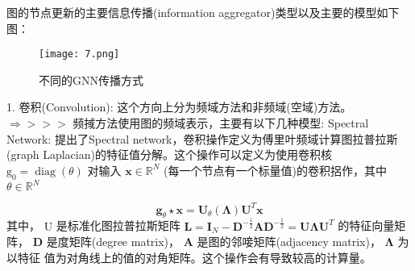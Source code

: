 \documentclass[a4paper,UTF8]{article}
\numberwithin{equation}{section}
\begin{document}
{		图的节点更新的主要信息传播(information aggregator)类型以及主要的模型如下图：
		\begin{figure}[ht]
			\centering
			\texttt{[image: 7.png]}
			\caption{不同的GNN传播方式}
			\label{fig:label}
		\end{figure}
		
		1. 卷积(Convolution): 这个方向上分为频域方法和非频域(空域)方法。
		$\Rightarrow>>>$ 频掝方法使用图的频域表示，主要有以下几种模型:
		Spectral Network: \citep{conf/Thomas2017}提出了Spectral network，卷积操作定义为傅里叶频域计算图拉普拉斯(graph Laplacian)的特征值分解。这个操作可以定义为使用卷积核 $\mathrm{g}_{0}=\operatorname{diag}(\theta)$ 对输入 $\mathbf{x} \in \mathbb{R}^{N}$ (每一个节点有一个标量值)的卷积捛作，其中 $\theta \in \mathbb{R}^{N}$
		
		$$
		\mathbf{g}_{\theta} \star \mathbf{x}=\mathbf{U}_{\theta}(\boldsymbol{\Lambda}) \mathbf{U}^{T} \mathbf{x}
		$$
		其中， $\mathrm{U}$ 是标准化图拉普拉斯矩阵 $\mathbf{L}=\mathbf{I}_{N}-\mathbf{D}^{-\frac{1}{2}} \mathbf{A D}^{-\frac{1}{2}}=\mathbf{U} \mathbf{\Lambda} \mathbf{U}^{T}$ 的特征向量矩 阵， $\mathbf{D}$ 是度矩阵(degree matrix)， $\mathbf{A}$ 是图的邻唼矩阵(adjacency matrix)， $\mathbf{\Lambda}$ 为以特征 值为对角线上的值的对角矩阵。这个操作会有导致较高的计算量。
		
}
\end{document}
